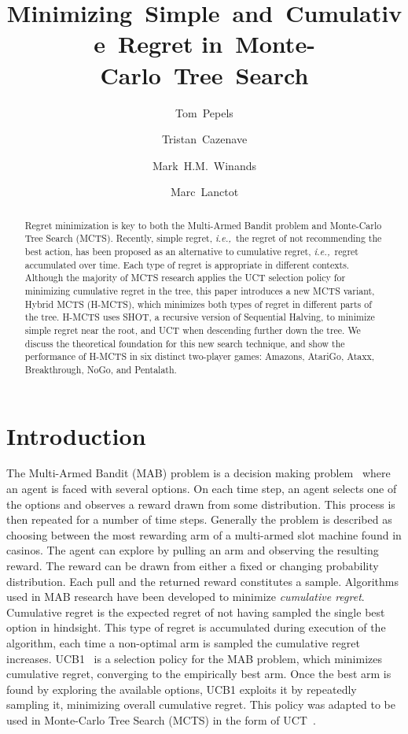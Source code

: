 \documentclass[a4paper]{llncs}
\title{Minimizing~Simple~and~Cumulative~Regret in~Monte-Carlo~Tree~Search}
\author{Tom~Pepels\inst{1} \and Tristan~Cazenave\inst{2} \and
Mark~H.M.~Winands\inst{1} \and Marc~Lanctot\inst{1}}
\institute{Department of Knowledge Engineering,  Maastricht University\\ \email{\{tom.pepels,m.winands,marc.lanctot\}@maastrichtuniversity.nl} \and LAMSADE - Université Paris-Dauphine \\ \email{cazenave@lamsade.dauphine.fr}}
\newcommand{\ie}{{\it i.e.,}~}
\begin{document}
\maketitle

\begin{abstract} Regret minimization is key to both the Multi-Armed Bandit problem and Monte-Carlo Tree Search (MCTS). Recently, simple regret, \ie the regret of not recommending the best action, has been proposed as an alternative to cumulative regret, \ie regret accumulated over time. Each type of regret is appropriate in different contexts. Although the majority of MCTS research applies the UCT selection policy for minimizing cumulative regret in the tree, this paper introduces a new MCTS variant, Hybrid MCTS (H-MCTS), which minimizes both types of regret in different parts of the tree. H-MCTS uses SHOT, a recursive version of Sequential Halving, to minimize simple regret near the root, and UCT when descending further down the tree. We discuss the theoretical foundation for this new search technique, and show the performance of H-MCTS in six distinct two-player games: Amazons, AtariGo, Ataxx, Breakthrough, NoGo, and Pentalath.

\end{abstract}

\section{Introduction}
\label{sec:intro}

The Multi-Armed Bandit (MAB) problem is a decision making problem~\cite{auer2002using} where an agent is faced with several options. On each time step, an agent selects one of the options and observes a reward drawn from some distribution. This process is then repeated for a number of time steps.
Generally the problem is described as choosing between the most rewarding arm of a multi-armed slot machine found in casinos. The agent can explore by pulling an arm and observing the resulting reward. The reward can be drawn from either a fixed or changing probability distribution. Each pull and the returned reward constitutes a sample. Algorithms used in MAB research have been developed to minimize \emph{cumulative regret}. Cumulative regret is the expected regret of not having sampled the single best option in hindsight. This type of regret is accumulated during execution of the algorithm, each time a non-optimal arm is sampled the cumulative regret increases. UCB1~\cite{auer2002using} is a selection policy for the MAB problem, which minimizes cumulative regret, converging to the empirically best arm. Once the best arm is found by exploring the available options, UCB1 exploits it by repeatedly sampling it, minimizing overall cumulative regret. This policy was adapted to be used in Monte-Carlo Tree Search (MCTS) in the form of UCT~\cite{kocsis2006bandit}.
\end{document}
